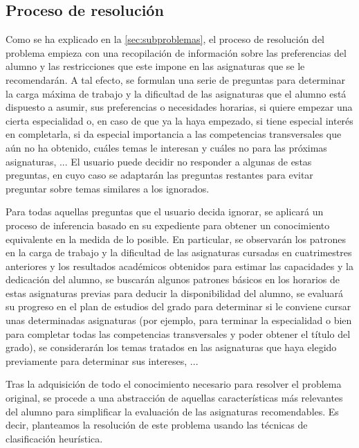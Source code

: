 
\subsection{Proceso de resolución} \label{sec:desc-resolucion}

Como se ha explicado en la \autoref{sec:subproblemas}, el proceso de 
resolución del problema empieza con una recopilación de información sobre las 
preferencias del alumno y las restricciones que este impone en las asignaturas 
que se le recomendarán. A tal efecto, se formulan una serie de preguntas para 
determinar la carga máxima de trabajo y la dificultad de las asignaturas que 
el alumno está dispuesto a asumir, sus preferencias o necesidades horarias, 
si quiere empezar una cierta especialidad o, en caso de que ya la haya 
empezado, si tiene especial interés en completarla, si da especial importancia 
a las competencias transversales que aún no ha obtenido, cuáles temas le 
interesan y cuáles no para las próximas asignaturas, ... El usuario puede 
decidir no responder a algunas de estas preguntas, en cuyo caso se adaptarán 
las preguntas restantes para evitar preguntar sobre temas similares a los 
ignorados.

Para todas aquellas preguntas que el usuario decida ignorar, se aplicará un 
proceso de inferencia basado en su expediente para obtener un conocimiento 
equivalente en la medida de lo posible. En particular, se observarán los 
patrones en la carga de trabajo y la dificultad de las asignaturas cursadas 
en cuatrimestres anteriores y los resultados académicos obtenidos para estimar 
las capacidades y la dedicación del alumno, se buscarán algunos patrones 
básicos en los horarios de estas asignaturas previas para deducir la 
disponibilidad del alumno, se evaluará su progreso en el plan de estudios del 
grado para determinar si le conviene cursar unas determinadas asignaturas 
(por ejemplo, para terminar la especialidad o bien para completar todas las 
competencias transversales y poder obtener el título del grado), se 
considerarán los temas tratados en las asignaturas que haya elegido 
previamente para determinar sus intereses, ...

Tras la adquisición de todo el conocimiento necesario para resolver el 
problema original, se procede a una abstracción de aquellas características 
más relevantes del alumno para simplificar la evaluación de las asignaturas 
recomendables. Es decir, planteamos la resolución de este problema usando las 
técnicas de clasificación heurística.

